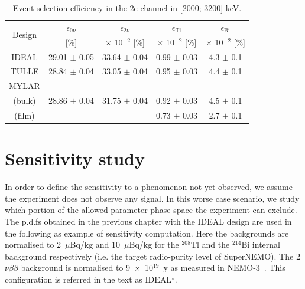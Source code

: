 \documentclass[main.tex]{subfiles}
\begin{document}
\begin{table}[h!]
\centering
\begin{tabular}{c|c|c|c|c}
\toprule
\multirow{2}{*}{Design} & $\epsilon_{\text{0}\nu}$ & $\epsilon_{\text{2}\nu}$ & $\epsilon_{\text{Tl}}$ & $\epsilon_{\text{Bi}}$  \\
& [\%]   & $\times$ 10$^{-\text{2}}$ [\%] & $\times$ 10$^{-\text{2}}$ [\%] & $\times$ 10$^{-\text{2}}$ [\%] \\[0.1cm]
\hline
IDEAL & 29.01 $\pm$ 0.05 & 33.64 $\pm$ 0.04 & 0.99 $\pm$ 0.03 & 4.3 $\pm$ 0.1 \\[0.05cm]
\hline
TULLE & 28.84 $\pm$ 0.04 & 33.05 $\pm$ 0.04 & 0.95 $\pm$ 0.03 & 4.4 $\pm$ 0.1 \\[0.05cm]
\hline
MYLAR & & & & \\[0.1cm]
(bulk)& 28.86 $\pm$ 0.04 & 31.75 $\pm$ 0.04 & 0.92 $\pm$ 0.03 & 4.5 $\pm$ 0.1 \\[0.05cm]
(film)& & & 0.73 $\pm$ 0.03 & 2.7 $\pm$ 0.1 \\ 
\bottomrule
\end{tabular}
\caption{Event selection efficiency in the 2e channel in [2000; 3200] keV.}
\label{Tab:EventSelectionEfficiency}
\end{table}


\FloatBarrier


\section{Sensitivity study}\label{sec:SensStudy}




\NI In order to define the sensitivity to a phenomenon not yet observed, we assume the experiment does not observe any signal. In this worse case scenario, we study which portion of the allowed parameter phase space the experiment can exclude. The p.d.fs obtained in the previous chapter with the IDEAL design are used in the following as example of sensitivity computation. Here the backgrounds are normalised to 2~$\mu$Bq/kg and 10~$\mu$Bq/kg for the $^{\text{208}}$Tl and the $^{\text{214}}$Bi internal background respectively (i.e. the target radio-purity level of SuperNEMO). The 2$\nu\beta\beta$ background is normalised to 9~$\times$~10$^{\text{19}}$~y as measured in NEMO-3~\cite{NEMO3-BKG}. This configuration is referred in the text as IDEAL$^{\star}$.
\end{document}
